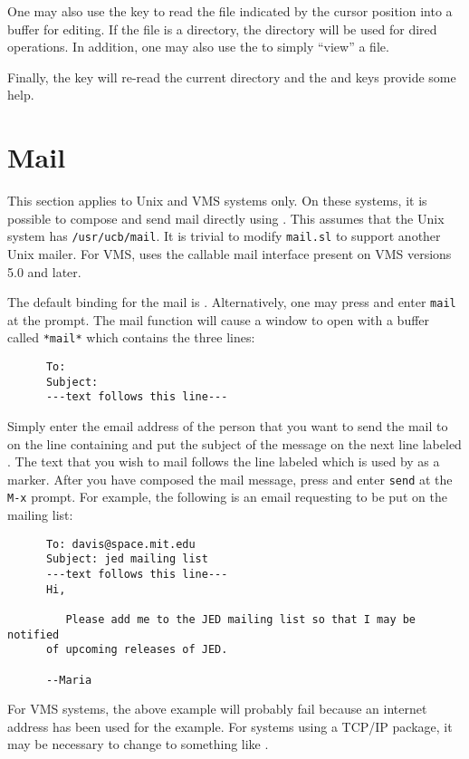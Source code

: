   One may also use the  key to read the file indicated by the cursor
  position into a buffer for editing.  If the file is a directory, the
  directory will be used for dired operations. In addition, one may also use
  the  to simply ``view'' a file.

  Finally, the  key will re-read the current directory and the
   and  keys provide some help.

\section{Mail}

  This section applies to Unix and VMS systems only.  On these systems, it
  is possible to compose and send mail directly using \jed{}.  This assumes
  that the Unix system has \verb|/usr/ucb/mail|.  It is trivial to modify
  \verb|mail.sl| to support another Unix mailer.  For VMS, \jed{} uses the
  callable mail interface present on VMS versions 5.0 and later.

  The default binding for the mail is .  Alternatively, one
  may press  and enter \verb|mail| at the  prompt.
  The mail function will cause a window to open with a buffer called
  \verb|*mail*| which contains the three lines:
\begin{verbatim}
      To: 
      Subject: 
      ---text follows this line---
\end{verbatim}
  Simply enter the email address of the person that you want to send the
  mail to on the line containing  and put the subject of the
  message on the next line labeled .  The text that you wish
  to mail follows the line labeled  which
  is used by \jed{} as a marker. After you have composed the mail message,
  press  and enter \verb|send| at the \verb|M-x| prompt.  For
  example, the following is an email requesting to be put on the \jed{} mailing
  list:

\begin{verbatim}
      To: davis@space.mit.edu
      Subject: jed mailing list
      ---text follows this line---
      Hi,
      
         Please add me to the JED mailing list so that I may be notified
      of upcoming releases of JED.

      --Maria
\end{verbatim}

  For VMS systems, the above example will probably fail because an internet
  address has been used for the example.  For systems using a TCP/IP
  package, it may be necessary to change  to
  something
  like .

